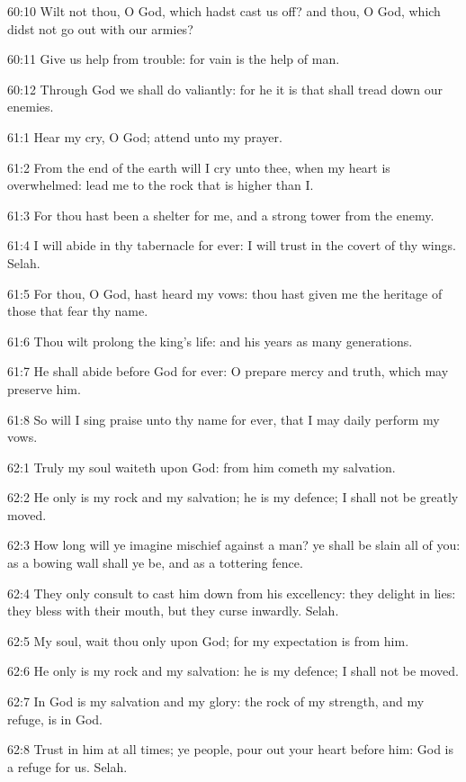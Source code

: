 60:10 Wilt not thou, O God, which hadst cast us off? and thou, O God, which didst not go out with our armies?

60:11 Give us help from trouble: for vain is the help of man.

60:12 Through God we shall do valiantly: for he it is that shall tread down our enemies.



61:1 Hear my cry, O God; attend unto my prayer.

61:2 From the end of the earth will I cry unto thee, when my heart is overwhelmed: lead me to the rock that is higher than I.

61:3 For thou hast been a shelter for me, and a strong tower from the enemy.

61:4 I will abide in thy tabernacle for ever: I will trust in the covert of thy wings. Selah.

61:5 For thou, O God, hast heard my vows: thou hast given me the heritage of those that fear thy name.

61:6 Thou wilt prolong the king's life: and his years as many generations.

61:7 He shall abide before God for ever: O prepare mercy and truth, which may preserve him.

61:8 So will I sing praise unto thy name for ever, that I may daily perform my vows.



62:1 Truly my soul waiteth upon God: from him cometh my salvation.

62:2 He only is my rock and my salvation; he is my defence; I shall not be greatly moved.

62:3 How long will ye imagine mischief against a man? ye shall be slain all of you: as a bowing wall shall ye be, and as a tottering fence.

62:4 They only consult to cast him down from his excellency: they delight in lies: they bless with their mouth, but they curse inwardly.  Selah.

62:5 My soul, wait thou only upon God; for my expectation is from him.

62:6 He only is my rock and my salvation: he is my defence; I shall not be moved.

62:7 In God is my salvation and my glory: the rock of my strength, and my refuge, is in God.

62:8 Trust in him at all times; ye people, pour out your heart before him: God is a refuge for us. Selah.

